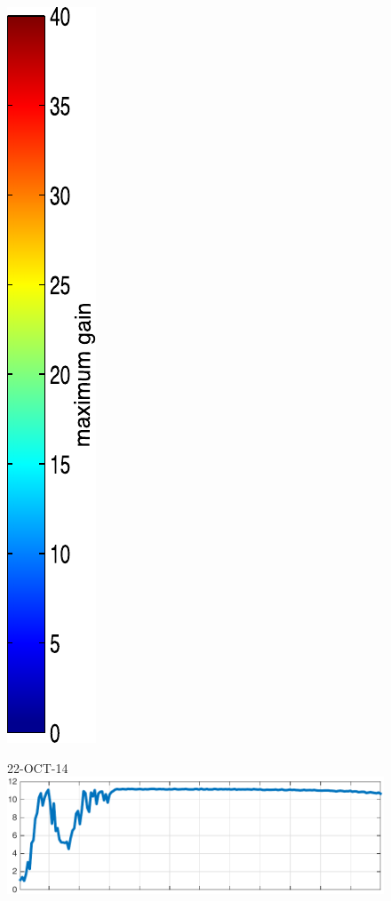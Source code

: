 \begin{figure}
\begin{minipage}[c]{\mylength}
\includegraphics[valign=t,trim=2pt -8pt 0 5pt,width=\colorbarwidth,totalheight=\eventheight]{events/colorbar-40.pdf}
\end{minipage}
\begin{minipage}[c]{\mylength}
\centering \scriptsize 22-OCT-14 \\
\includegraphics[valign=t,trim=0 0 5pt 0,angle=90,origin=tr,width=\sunintwidth,totalheight=\eventheight]{events/20141022-intensity.pdf}

\end{minipage}
\end{figure}
